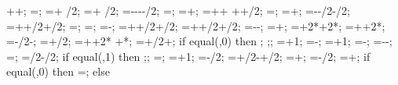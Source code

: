 {{  \buildingwidth+\rightsoildist+\engbedrockrightdist;
\engbedrockdeltay=\engbedrockdepth;
\engbedrockmidx=\engbedrockstartx + \engbedrockdeltax/2;
\engbedrockmidy=\engbedrockstarty + \engbedrockdeltay/2;
\translayerleftstartx=-\supportwidth-\hsdistleft-\leftsoildist-\translayerlinet/2;
\translayerleftstarty=\leftwallh;
\translayerleftdeltay=\leftwallh+\soilbelowfoundtof;
\translayerrightstartx=\supportwidth+\hsdistright+
	\rightsoildist+\buildingwidth+\translayerlinet/2;
\translayerrightstarty=\rightwallh;
\translayerrightdeltay=\rightwallh+\soilbelowfoundtof;
\ssinterleftstartx=-\supportwidth-\baselinet/2-\ssinterlinet/2;
\ssinterrightstartx=\buildingwidth+\supportwidth+\baselinet/2+\ssinterlinet/2;
\ssinterleftstarty=\leftwallh;
\ssinterrightstarty=\rightwallh;
\ssinterdeltax=\ssinterrightstartx-\ssinterleftstartx;
\ssinterleftdeltay=\leftwallh+\supportheight+\baselinet/2+\ssinterlinet/2;
\ssinterrightdeltay=\rightwallh+\supportheight+\baselinet/2+\ssinterlinet/2;
\markssleftstartx=-\supportwidth-\markssexspace;
\markssleftstarty=\basewalldepth+\markssexspace;
\markssdeltax=\buildingwidth+2*\supportwidth+2*\markssexspace;
\markssdeltay=\basewalldepth+\supportheight+2*\markssexspace;
\supershadestartx=-\collinet/2-\supershadespace;
\supershadestarty=\basewalldepth+\baselinet/2;
\supershadedeltax=\buildingwidth+\collinet+2*\supershadespace
 +*\showdefl;
\supershadedeltay=\superstorynumber*\storyheight+\beamlinet/2+\supershadespace;
if equal(\showlessbays,0) then {
;
;};
\startcol=\leftbays+1;
\endcol=\columnnumber-\rightbays;
\startbeam=\leftbays+1;
\endbeam=\baynumber-\rightbays;
\superbays=\baynumber-\leftbays-\rightbays;
\superwidth=\superbays*\baywidth;
\groundbeamshifty=\groundbeamlinet/2-\baselinet/2;
if equal(\showdefl,1) then {;};
\shearwallstartcolumn=\shearwallbay;
\shearwallendcolumn=\shearwallbay+1;
\shearwallstartx=\x{\shearwallstartcolumn}-\collinet/2;
\shearwallstarty=+\baselinet/2-+\shearwalllinet/2;
\shearwalldeltax=\baywidth+\collinet;
\shearwallsupportstartx=\shearwallstartx-\supportwidth/2;
\shearwallsupportdeltax=\shearwalldeltax+\supportwidth;
if equal(\superstorynumber,0) then {
\shearwalldeltay=\y{\levelnumber};} else
}}

